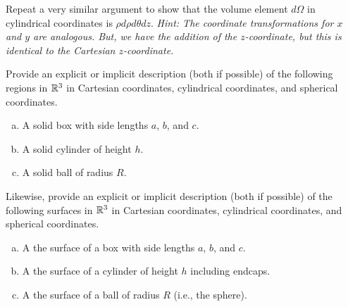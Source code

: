 \documentclass[12pt]{article} %
\begin{document}
\vspace*{1cm}
\begin{problem}
    Repeat a very similar argument to show that the volume element $d\Omega$ in cylindrical coordinates is $\rho d\rho d\theta dz$.  \emph{Hint: The coordinate transformations for $x$ and $y$ are analogous.  But, we have the addition of the $z$-coordinate, but this is identical to the Cartesian $z$-coordinate.}
\end{problem}

\vspace*{1cm}
\begin{problem}
Provide an explicit or implicit description (both if possible) of the following regions in $\mathbb{R}^3$ in Cartesian coordinates, cylindrical coordinates, and spherical coordinates.
    \begin{enumerate}[(a)]
        \item A solid box with side lengths $a$, $b$, and $c$.
        \item A solid cylinder of height $h$.
        \item A solid ball of radius $R$.
    \end{enumerate}
\end{problem}

\vspace*{1cm}
\begin{problem}
Likewise, provide an explicit or implicit description (both if possible) of the following surfaces in $\mathbb{R}^3$ in Cartesian coordinates, cylindrical coordinates, and spherical coordinates.
    \begin{enumerate}[(a)]
        \item A the surface of a box with side lengths $a$, $b$, and $c$.
        \item A the surface of a cylinder of height $h$ including endcaps.
        \item A the surface of a ball of radius $R$ (i.e., the sphere).
    \end{enumerate}
\end{problem}
\end{document}
